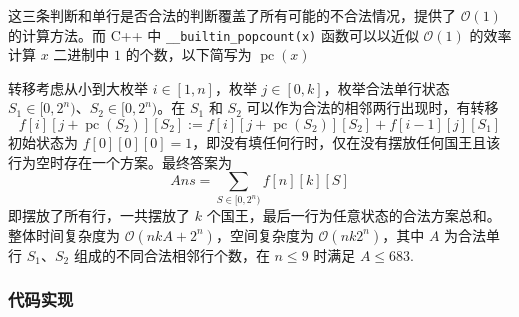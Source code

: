 这三条判断和单行是否合法的判断覆盖了所有可能的不合法情况，提供了
\(\mathcal{O}(1)\) 的计算方法。而 C++ 中
\texttt{\_\_builtin\_popcount(x)} 函数可以以近似 \(\mathcal{O}(1)\)
的效率计算 \(x\) 二进制中 \(1\) 的个数，以下简写为
\(\operatorname{pc}(x)\)

转移考虑从小到大枚举 \(i\in[1,n]\)，枚举 \(j\in[0,k]\)，枚举合法单行状态
\(S_1\in[0,2^n)\)、\(S_2\in[0,2^n)\)。在 \(S_1\) 和 \(S_2\)
可以作为合法的相邻两行出现时，有转移 \[
f[i][j+\operatorname{pc}(S_2)][S_2]:=f[i][j+\operatorname{pc}(S_2)][S_2]+f[i-1][j][S_1]
\] 初始状态为
\(f[0][0][0]=1\)，即没有填任何行时，仅在没有摆放任何国王且该行为空时存在一个方案。最终答案为
\[
Ans=\sum_{S\in[0,2^n)}f[n][k][S]
\] 即摆放了所有行，一共摆放了 \(k\)
个国王，最后一行为任意状态的合法方案总和。整体时间复杂度为
\(\mathcal{O}(nkA+2^n)\)，空间复杂度为 \(\mathcal{O}(nk2^n)\)，其中
\(A\) 为合法单行 \(S_1\)、\(S_2\) 组成的不同合法相邻行个数，在
\(n\le 9\) 时满足 \(A\le 683\).

\subsubsection{代码实现}

